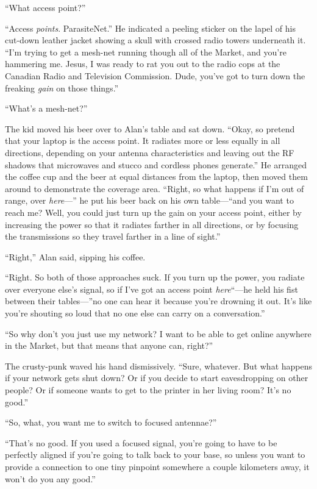 \documentclass{article}
\begin{document}
``What access point?''

``Access \textit{points}.  ParasiteNet.'' He indicated a peeling
sticker on the lapel of his cut-down leather jacket showing a skull
with crossed radio towers underneath it.  ``I'm trying to get a
mesh-net running though all of the Market, and you're hammering me. 
Jesus, I was ready to rat you out to the radio cops at the Canadian
Radio and Television Commission.  Dude, you've got to turn down the
freaking \textit{gain} on those things.''

``What's a mesh-net?''

The kid moved his beer over to Alan's table and sat down.  ``Okay, so
pretend that your laptop is the access point.  It radiates more or
less equally in all directions, depending on your antenna
characteristics and leaving out the RF shadows that microwaves and
stucco and cordless phones generate.'' He arranged the coffee cup and
the beer at equal distances from the laptop, then moved them around to
demonstrate the coverage area.  ``Right, so what happens if I'm out of
range, over \textit{here}---'' he put his beer back on his own
table---``and you want to reach me?  Well, you could just turn up the
gain on your access point, either by increasing the power so that it
radiates farther in all directions, or by focusing the transmissions
so they travel farther in a line of sight.''

``Right,'' Alan said, sipping his coffee.

``Right.  So both of those approaches suck.  If you turn up the power,
you radiate over everyone else's signal, so if I've got an access
point \textit{here}``---he held his fist between their tables---''no one
can hear it because you're drowning it out.  It's like you're shouting
so loud that no one else can carry on a conversation.''

``So why don't you just use my network?  I want to be able to get
online anywhere in the Market, but that means that anyone can,
right?''

The crusty-punk waved his hand dismissively.  ``Sure, whatever.  But
what happens if your network gets shut down?  Or if you decide to
start eavesdropping on other people?  Or if someone wants to get to
the printer in her living room?  It's no good.''

``So, what, you want me to switch to focused antennae?''

``That's no good.  If you used a focused signal, you're going to have
to be perfectly aligned if you're going to talk back to your base, so
unless you want to provide a connection to one tiny pinpoint somewhere
a couple kilometers away, it won't do you any good.''
\end{document}
